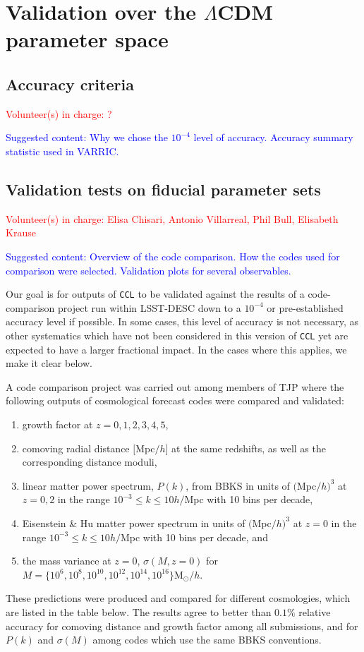 \documentclass[\docopts]{\docclass}
\newcommand{\vol}[1]{\textcolor{red}{Volunteer(s) in charge: #1}}
\newcommand{\cont}[1]{\textcolor{blue}{Suggested content: #1}}
\newcommand{\ccl}{{\tt CCL}\xspace}
\begin{document}
\section{Validation over the $\Lambda$CDM parameter space}

\subsection{Accuracy criteria}
\vol{?}

\cont{Why we chose the $10^{-4}$ level of accuracy. Accuracy summary statistic used in VARRIC.}

\subsection{Validation tests on fiducial parameter sets}
\vol{Elisa Chisari, Antonio Villarreal, Phil Bull, Elisabeth Krause}

\cont{Overview of the code comparison. How the codes used for comparison were selected. Validation plots for several observables.}

Our goal is for outputs of \ccl to be validated against the results of a code-comparison project run within LSST-DESC down to a $10^{-4}$ or pre-established accuracy level if possible. In some cases, this level of accuracy is not necessary, as other systematics which have not been considered in this version of \ccl yet are expected to have a larger fractional impact. In the cases where this applies, we make it clear below.


A code comparison project was carried out among members of TJP where the following outputs of cosmological forecast codes were compared and validated:
\begin{enumerate}
\item growth factor at $z = 0,1,2,3,4,5$,
\item comoving radial distance $[$Mpc$/h]$ at the same redshifts, as well as the corresponding distance moduli,
\item linear matter power spectrum, $P(k)$, from BBKS \citep{BBKS} in units of $($Mpc$/h)^3$ at $z=0,2$ in the range $10^{-3} \leq k \leq 10 h/$Mpc with 10 bins per decade,
\item Eisenstein \& Hu matter power spectrum in units of $($Mpc$/h)^3$ at $z=0$ in the range $10^{-3} \leq k \leq 10 h/$Mpc with 10 bins per decade, and
\item the mass variance at $z=0$, $\sigma(M,z=0)$ for $M =\{10^6, 10^8, 10^{10}, 10^{12}, 10^{14}, 10^{16}\} $M$_\odot/h$.
\end{enumerate}
These predictions were produced and compared for different cosmologies, which are listed in the table below. The results agree to better than $0.1\%$ relative accuracy for comoving distance and growth factor among all submissions, and for $P(k)$ and $\sigma(M)$ among codes which use the same BBKS conventions.
\end{document}
